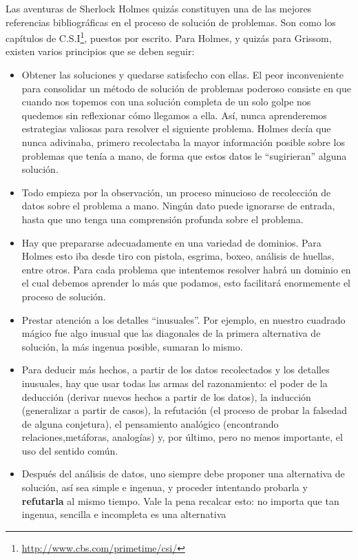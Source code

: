 Las aventuras de Sherlock Holmes quizás constituyen una de las mejores
referencias bibliográficas en el proceso de solución de problemas.
Son como los capítulos de C.S.I\footnote{\url{http://www.cbs.com/primetime/csi/}},
puestos por escrito. Para Holmes, y quizás para Grissom, existen varios
principios que se deben seguir:
\begin{itemize}
\item Obtener las soluciones y quedarse satisfecho con ellas. El peor inconveniente
para consolidar un método de solución de problemas poderoso consiste
en que cuando nos topemos con una solución completa de un solo golpe
nos quedemos sin reflexionar cómo llegamos a ella. Así, nunca aprenderemos
estrategias valiosas para resolver el siguiente problema. Holmes decía
que nunca adivinaba, primero recolectaba la mayor información posible
sobre los problemas que tenía a mano, de forma que estos datos le
``sugirieran'' alguna solución.
\item Todo empieza por la observación, un proceso minucioso de recolección
de datos sobre el problema a mano. Ningún dato puede ignorarse de
entrada, hasta que uno tenga una comprensión profunda sobre el problema.
\item Hay que prepararse adecuadamente en una variedad de dominios. Para
Holmes esto iba desde tiro con pistola, esgrima, boxeo, análisis de
huellas, entre otros. Para cada problema que intentemos resolver habrá
un dominio en el cual debemos aprender lo más que podamos, esto facilitará
enormemente el proceso de solución.
\item Prestar atención a los detalles ``inusuales''. Por ejemplo, en nuestro
cuadrado mágico fue algo inusual que las diagonales de la primera
alternativa de solución, la más ingenua posible, sumaran lo mismo.
\item Para deducir más hechos, a partir de los datos recolectados y los
detalles inusuales, hay que usar todas las armas del razonamiento:
el poder de la deducción (derivar nuevos hechos a partir de los datos),
la inducción (generalizar a partir de casos), la refutación (el proceso
de probar la falsedad de alguna conjetura), el pensamiento analógico
(encontrando relaciones,metáforas, analogías) y, por último, pero
no menos importante, el uso del sentido común.
\item Después del análisis de datos, uno siempre debe proponer una alternativa
de solución, así sea simple e ingenua, y proceder intentando probarla
y \textbf{refutarla} al mismo tiempo. Vale la pena recalcar esto:
no importa que tan ingenua, sencilla e incompleta es una alternativa

\end{itemize}
